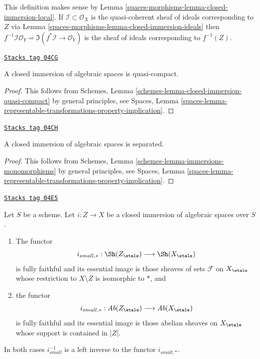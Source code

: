This definition makes sense by Lemma \ref{spaces-morphisms-lemma-closed-immersion-local}.
If $\mathcal{I} \subset \mathcal{O}_X$ is the quasi-coherent sheaf of
ideals corresponding to $Z$ via Lemma \ref{spaces-morphisms-lemma-closed-immersion-ideals} then
$f^{-1}\mathcal{I}\mathcal{O}_Y = \Im(f^*\mathcal{I} \to \mathcal{O}_Y)$
is the sheaf of ideals corresponding to $f^{-1}(Z)$.

\begin{lemma}
\label{spaces-morphisms-lemma-closed-immersion-quasi-compact}
\href{https://stacks.math.columbia.edu/tag/04CG}{\texttt{Stacks tag 04CG}}

A closed immersion of algebraic spaces is quasi-compact.
\end{lemma}

\begin{proof}
This follows from
Schemes, Lemma \ref{schemes-lemma-closed-immersion-quasi-compact}
by general principles, see
Spaces, Lemma
\ref{spaces-lemma-representable-transformations-property-implication}.
\end{proof}

\begin{lemma}
\label{spaces-morphisms-lemma-closed-immersion-separated}
\href{https://stacks.math.columbia.edu/tag/04CH}{\texttt{Stacks tag 04CH}}

A closed immersion of algebraic spaces is separated.
\end{lemma}

\begin{proof}
This follows from
Schemes, Lemma \ref{schemes-lemma-immersions-monomorphisms}
by general principles, see
Spaces, Lemma
\ref{spaces-lemma-representable-transformations-property-implication}.
\end{proof}

\begin{lemma}
\label{spaces-morphisms-lemma-closed-immersion-push-pull}
\href{https://stacks.math.columbia.edu/tag/04E5}{\texttt{Stacks tag 04E5}}

Let $S$ be a scheme. Let $i : Z \to X$ be a closed immersion of algebraic
spaces over $S$.
\begin{enumerate}
\item The functor
$$
i_{small, *} :
\Sh(Z_\etale)
\longrightarrow
\Sh(X_\etale)
$$
is fully faithful and its essential image is those sheaves of sets
$\mathcal{F}$ on $X_\etale$ whose restriction to $X \setminus Z$ is
isomorphic to $*$, and
\item the functor
$$
i_{small, *} :
\textit{Ab}(Z_\etale)
\longrightarrow
\textit{Ab}(X_\etale)
$$
is fully faithful and its essential image is those abelian sheaves on
$X_\etale$ whose support is contained in $|Z|$.
\end{enumerate}
In both cases $i_{small}^{-1}$ is a left inverse to the functor
$i_{small, *}$.
\end{lemma}

